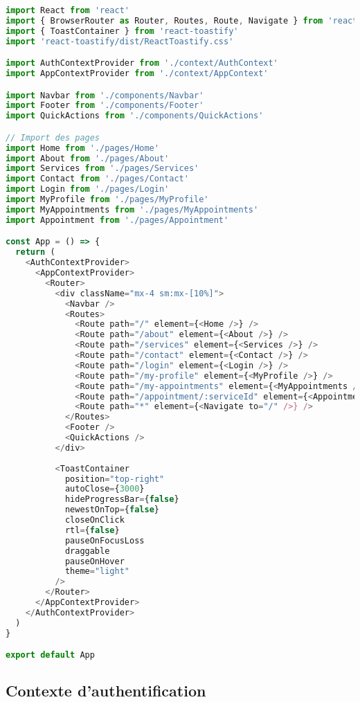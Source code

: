\begin{lstlisting}[language=JavaScript, caption=App.jsx - Composant racine de l'application]
import React from 'react'
import { BrowserRouter as Router, Routes, Route, Navigate } from 'react-router-dom'
import { ToastContainer } from 'react-toastify'
import 'react-toastify/dist/ReactToastify.css'

import AuthContextProvider from './context/AuthContext'
import AppContextProvider from './context/AppContext'

import Navbar from './components/Navbar'
import Footer from './components/Footer'
import QuickActions from './components/QuickActions'

// Import des pages
import Home from './pages/Home'
import About from './pages/About'
import Services from './pages/Services'
import Contact from './pages/Contact'
import Login from './pages/Login'
import MyProfile from './pages/MyProfile'
import MyAppointments from './pages/MyAppointments'
import Appointment from './pages/Appointment'

const App = () => {
  return (
    <AuthContextProvider>
      <AppContextProvider>
        <Router>
          <div className="mx-4 sm:mx-[10%]">
            <Navbar />
            <Routes>
              <Route path="/" element={<Home />} />
              <Route path="/about" element={<About />} />
              <Route path="/services" element={<Services />} />
              <Route path="/contact" element={<Contact />} />
              <Route path="/login" element={<Login />} />
              <Route path="/my-profile" element={<MyProfile />} />
              <Route path="/my-appointments" element={<MyAppointments />} />
              <Route path="/appointment/:serviceId" element={<Appointment />} />
              <Route path="*" element={<Navigate to="/" />} />
            </Routes>
            <Footer />
            <QuickActions />
          </div>
          
          <ToastContainer
            position="top-right"
            autoClose={3000}
            hideProgressBar={false}
            newestOnTop={false}
            closeOnClick
            rtl={false}
            pauseOnFocusLoss
            draggable
            pauseOnHover
            theme="light"
          />
        </Router>
      </AppContextProvider>
    </AuthContextProvider>
  )
}

export default App
\end{lstlisting}

\subsection{Contexte d'authentification}

